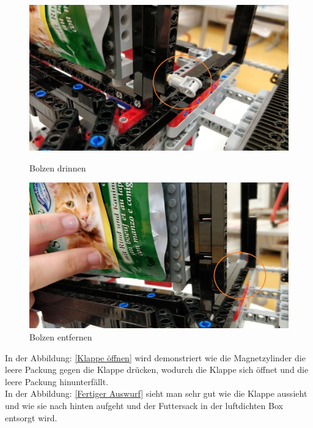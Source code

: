 \begin{figure}[H]
   \begin{minipage}[hbt]{0.5\textwidth} %
      \includegraphics[width=1\textwidth]{Bilder/Ablauf_1_png/Auswurf_2}
      \caption{Bolzen drinnen}
      \label{Bolzen drinnen}
   \end{minipage}
   \hspace{.04\linewidth}%
   \begin{minipage}[hbt]{0.5\textwidth} %
      \includegraphics[width=1\textwidth]{Bilder/Ablauf_1_png/Auswurf_3}
      \caption{Bolzen entfernen}
	  \label{Bolzen entfernen}      
      \end{minipage}
\end{figure}


In der Abbildung: \ref{Klappe öffnen} wird demonstriert wie die Magnetzylinder die leere Packung gegen die Klappe drücken, wodurch die Klappe sich öffnet und die leere Packung hinunterfällt.\\

In der Abbildung: \ref{Fertiger Auswurf} sieht man sehr gut wie die Klappe aussieht und wie sie nach hinten aufgeht und der Futtersack in der luftdichten Box entsorgt wird.


